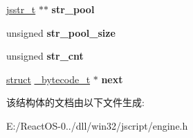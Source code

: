 \begin{DoxyCompactItemize}
\hyperlink{struct__jsstr__t}{jsstr\+\_\+t} $\ast$$\ast$ {\bfseries str\+\_\+pool}
\item 
\mbox{\label{struct__bytecode__t_a11639107979089ef2d3b68e4f22e664b}} 
unsigned {\bfseries str\+\_\+pool\+\_\+size}
\item 
\mbox{\label{struct__bytecode__t_aae52dd97902d9c9c61c89e9f7eecc5e2}} 
unsigned {\bfseries str\+\_\+cnt}
\item 
\mbox{\label{struct__bytecode__t_aa87431ca23ae710b9231f98256fdafb8}} 
\hyperlink{interfacestruct}{struct} \hyperlink{struct__bytecode__t}{\+\_\+bytecode\+\_\+t} $\ast$ {\bfseries next}
\end{DoxyCompactItemize}


该结构体的文档由以下文件生成\+:\begin{DoxyCompactItemize}
\item 
E\+:/\+React\+O\+S-\/0../dll/win32/jscript/engine.\+h\end{DoxyCompactItemize}
